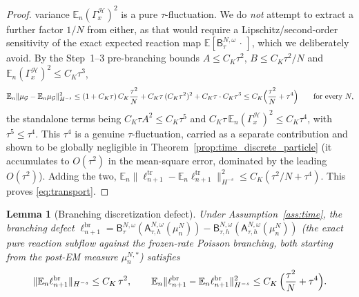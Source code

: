 \documentclass[a4paper,fleqn]{cas-sc}
\newtheorem{lemma}[theorem]{Lemma}
\theoremstyle{definition}
\theoremstyle{remark}
\begin{document}
\begin{proof}
variance $\mathbb E_n(\Gamma_x^{\mathcal H})^2$ is a pure $\tau$-fluctuation. We do
\emph{not} attempt to extract a further factor $1/N$ from either, as that would
require a Lipschitz/second-order sensitivity of the exact expected reaction map
$\mathbb E[\mathsf B^{N,\omega}_\tau\,\cdot\,]$, which we deliberately avoid. By the Step~1--3 pre-branching bounds
$A\le C_K\tau^2$, $B\le C_K\tau^2/N$ and $\mathbb E_n(\Gamma_x^{\mathcal H})^2\le C_K\tau^3$,
\[
\mathbb E_n\|\mu_{\mathcal G}-\mathbb E_n\mu_{\mathcal G}\|_{H^{-s}}^2
\le(1+C_K\tau)\,C_K\frac{\tau^2}{N}+C_K\tau\,(C_K\tau^2)^2+C_K\tau\cdot C_K\tau^3
\le C_K\Bigl(\frac{\tau^2}{N}+\tau^4\Bigr)
\qquad\text{for every }N,
\]
the standalone terms being $C_K\tau A^2\le C_K\tau^5$ and
$C_K\tau\,\mathbb E_n(\Gamma_x^{\mathcal H})^2\le C_K\tau^4$, with $\tau^5\le\tau^4$.
This $\tau^4$ is a genuine $\tau$-fluctuation, carried as a separate contribution and
shown to be globally negligible in
Theorem~\ref{prop:time_discrete_particle} (it accumulates to $O(\tau^2)$ in the
mean-square error, dominated by the leading $O(\tau^2)$).
Adding the two, $\mathbb E_n\|\ell^{\mathrm{tr}}_{n+1}-\mathbb E_n\ell^{\mathrm{tr}}_{n+1}\|_{H^{-s}}^2
\le C_K(\tau^2/N+\tau^4)$. This proves \eqref{eq:transport}.
\end{proof}

\begin{lemma}[Branching discretization defect]\label{lem:branch}
Under Assumption~\ref{ass:time}, the branching defect
$\ell^{\mathrm{br}}_{n+1}=\mathsf B^{N,\omega}_\tau(\mathsf A^{N,\omega}_{\tau,h}(\mu^N_n))
-\mathsf B^{N,\omega}_{\tau,h}(\mathsf A^{N,\omega}_{\tau,h}(\mu^N_n))$ (the exact
pure reaction subflow against the frozen-rate Poisson branching, both starting
from the post-EM measure $\mu^{N,*}_n$) satisfies
\begin{equation}\label{eq:branch}
\|\mathbb E_n\ell^{\mathrm{br}}_{n+1}\|_{H^{-s}}\le C_K\,\tau^2,
\qquad
\mathbb E_n\|\ell^{\mathrm{br}}_{n+1}-\mathbb E_n\ell^{\mathrm{br}}_{n+1}\|_{H^{-s}}^2
\le C_K\,\Bigl(\frac{\tau^2}{N}+\tau^4\Bigr).
\end{equation}
\end{lemma}
\end{document}

